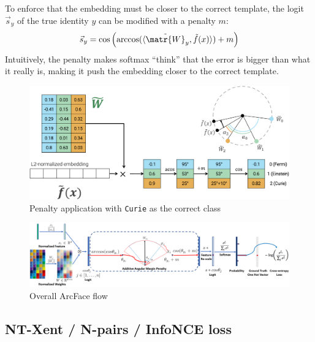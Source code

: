 \begin{description}
        To enforce that the embedding must be closer to the correct template, the logit $\vec{s}_y$ of the true identity $y$ can be modified with a penalty $m$:
        \[ \vec{s}_y = \cos\left( \arccos(\langle \tilde{\matr{W}}_y, \tilde{f}(x) \rangle) + m \right) \]
        Intuitively, the penalty makes softmax ``think'' that the error is bigger than what it really is, making it push the embedding closer to the correct template.

        \begin{figure}[H]
            \centering
            \includegraphics[width=0.65\linewidth]{./img/_arcface_penalty.pdf}
            \caption{Penalty application with \texttt{Curie} as the correct class}
        \end{figure}

        \begin{figure}[H]
            \centering
            \includegraphics[width=0.95\linewidth]{./img/_arcface_flow.png}
            \caption{Overall ArcFace flow}
        \end{figure}
\end{description}


\subsection{NT-Xent / N-pairs / InfoNCE loss}

